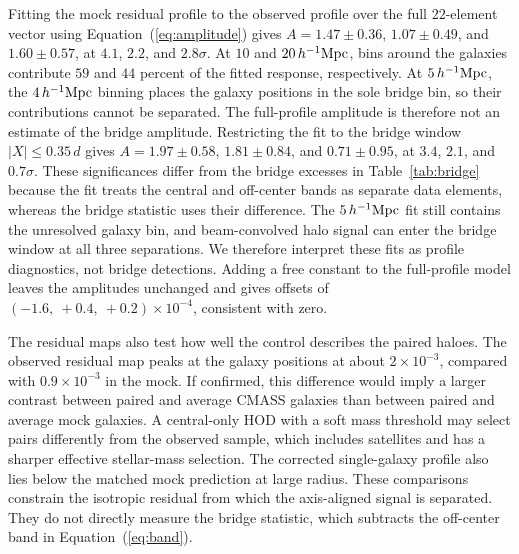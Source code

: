 \documentclass[preprint]{aastex701}
\newcommand{\hinvMpc}{h^{-1}{\rm Mpc}}
\begin{document}
Fitting the mock residual profile to the observed profile over the full
$22$-element vector using Equation~(\ref{eq:amplitude}) gives
$A=1.47\pm0.36$, $1.07\pm0.49$, and $1.60\pm0.57$, at $4.1$, $2.2$, and
$2.8\sigma$.
At $10$ and $20\,\hinvMpc$, bins around the galaxies contribute $59$ and
$44$ percent of the fitted response, respectively. At $5\,\hinvMpc$, the
$4\,\hinvMpc$ binning places the galaxy positions in the sole bridge bin, so
their contributions cannot be separated. The full-profile amplitude is
therefore not an estimate of the bridge amplitude. Restricting the fit to the
bridge window
$|X|\leq0.35\,d$ gives $A=1.97\pm0.58$, $1.81\pm0.84$, and $0.71\pm0.95$, at
$3.4$, $2.1$, and $0.7\sigma$. These significances differ from the bridge
excesses in Table~\ref{tab:bridge} because the fit treats the central and
off-center bands as separate data elements, whereas the bridge statistic
uses their difference. The $5\,\hinvMpc$ fit still contains the unresolved
galaxy bin, and beam-convolved halo signal can enter the bridge window at all
three separations. We therefore interpret these fits as profile diagnostics,
not bridge detections. Adding a free constant to the full-profile model leaves
the amplitudes unchanged and gives offsets of
$\left(-1.6,\ +0.4,\ +0.2\right)\times10^{-4}$, consistent with zero.





The residual maps also test how well the control describes the paired haloes.
The observed residual map peaks at the galaxy positions at about
$2\times10^{-3}$, compared with $0.9\times10^{-3}$ in the mock.
If confirmed, this difference would imply a larger contrast between paired
and average CMASS galaxies than between paired and average mock galaxies. A
central-only HOD with a soft mass threshold may select pairs differently from
the observed sample, which includes satellites and has a sharper effective
stellar-mass selection. The corrected single-galaxy profile also lies below
the matched mock prediction at large radius.
These comparisons constrain the isotropic residual from which the
axis-aligned signal is separated. They do not directly measure the bridge
statistic, which subtracts the off-center band in Equation~(\ref{eq:band}).
\end{document}

